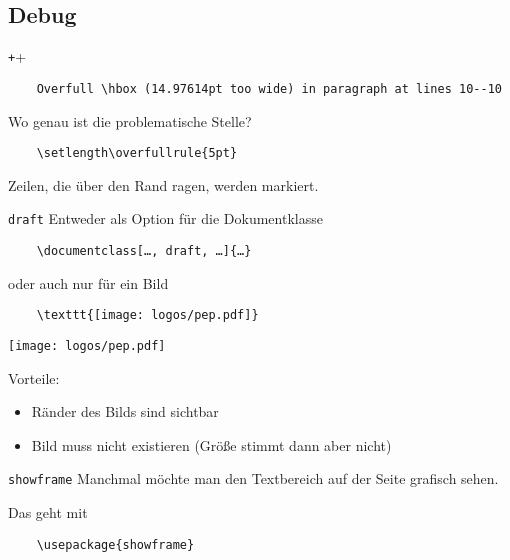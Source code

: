 \subsection{Debug}

\begin{frame}[fragile]{\texttt+\overfullrule+}

  \vspace{\baselineskip}
  \begin{verbatim}
    Overfull \hbox (14.97614pt too wide) in paragraph at lines 10--10
  \end{verbatim}
  Wo genau ist die problematische Stelle?

  \vspace{\baselineskip}
  \begin{verbatim}
    \setlength\overfullrule{5pt}
  \end{verbatim}

  \setlength\overfullrule{5pt}

  \vspace{\baselineskip}
  Zeilen, die über den Rand ragen, werden markiert.
\end{frame}

\begin{frame}[fragile]{\texttt{draft}}
  Entweder als Option für die Dokumentklasse
  \begin{verbatim}
    \documentclass[…, draft, …]{…}
  \end{verbatim}
  oder auch nur für ein Bild
  \begin{verbatim}
    \texttt{[image: logos/pep.pdf]}
  \end{verbatim}
  \texttt{[image: logos/pep.pdf]}

  Vorteile:
  \begin{itemize}
    \item Ränder des Bilds sind sichtbar
    \item Bild muss nicht existieren (Größe stimmt dann aber nicht)
  \end{itemize}
\end{frame}

\AddToShipoutPictureFG*{\ShowFramePicture}
\begin{frame}[fragile]{\texttt{showframe}}
  Manchmal möchte man den Textbereich auf der Seite grafisch sehen.

  Das geht mit
  \begin{verbatim}
    \usepackage{showframe}
  \end{verbatim}
\end{frame}


